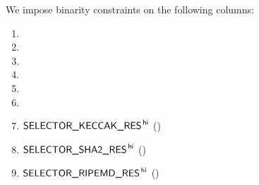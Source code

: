 We impose binarity constraints on the following columns:
\begin{multicols}{3}
	\begin{enumerate}
		\item \isShakiraKeccakData  
		\item \isShakiraShaTwoData  
		\item \isShakiraRipemdData    
		\item \isShakiraKeccakResult
		\item \isShakiraShaTwoResult
		\item \isShakiraRipemdResult  
		\item $\textsf{SELECTOR\_KECCAK\_RES}^{\mathsf{\,hi}}$ (\trash)
		\item $\textsf{SELECTOR\_SHA2\_RES}^{\mathsf{\,hi}}$ (\trash)
		\item $\textsf{SELECTOR\_RIPEMD\_RES}^{\mathsf{\,hi}}$ (\trash)
	\end{enumerate}
\end{multicols}
